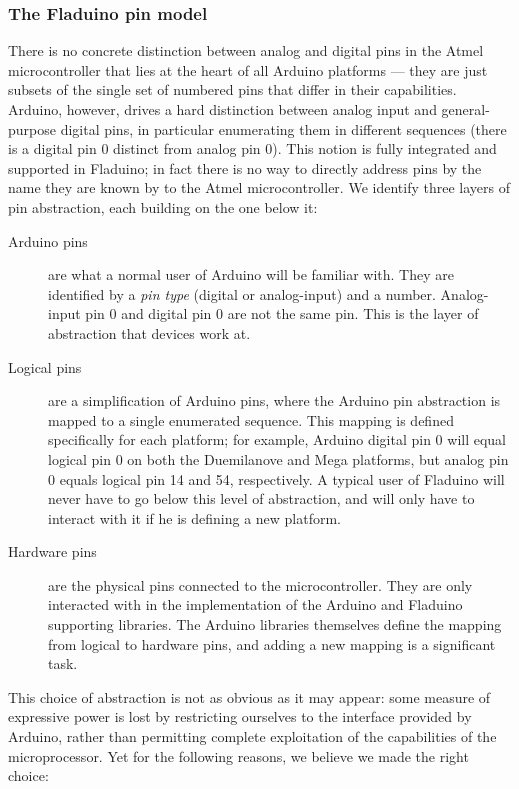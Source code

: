 \documentclass[a4paper, oneside, final]{memoir}
\begin{document}
\subsubsection{The Fladuino pin model}
\label{sec:pins}
There is no concrete distinction between analog and digital pins in
the Atmel microcontroller that lies at the heart of all Arduino
platforms --- they are just subsets of the single set of numbered pins
that differ in their capabilities.  Arduino, however, drives a hard
distinction between analog input and general-purpose digital pins, in
particular enumerating them in different sequences (there is a digital
pin 0 distinct from analog pin 0).  This notion is fully integrated
and supported in Fladuino; in fact there is no way to directly address
pins by the name they are known by to the Atmel microcontroller.  We
identify three layers of pin abstraction, each building on the one
below it:

\begin{description}
\item[Arduino pins] are what a normal user of Arduino will be familiar
  with.  They are identified by a \textit{pin type} (digital or
  analog-input) and a number.  Analog-input pin 0 and digital pin 0
  are not the same pin.  This is the layer of abstraction that devices
  work at.
\item[Logical pins] are a simplification of Arduino pins, where the
  Arduino pin abstraction is mapped to a single enumerated sequence.
  This mapping is defined specifically for each platform; for example,
  Arduino digital pin 0 will equal logical pin 0 on both the
  Duemilanove and Mega platforms, but analog pin 0 equals logical pin
  14 and 54, respectively.  A typical user of Fladuino will never have
  to go below this level of abstraction, and will only have to
  interact with it if he is defining a new platform.
\item[Hardware pins] are the physical pins connected to the
  microcontroller.  They are only interacted with in the
  implementation of the Arduino and Fladuino supporting libraries.
  The Arduino libraries themselves define the mapping from logical to
  hardware pins, and adding a new mapping is a significant task.
\end{description}

This choice of abstraction is not as obvious as it may appear: some
measure of expressive power is lost by restricting ourselves to the
interface provided by Arduino, rather than permitting complete
exploitation of the capabilities of the microprocessor.  Yet for the
following reasons, we believe we made the right choice:
\end{document}
